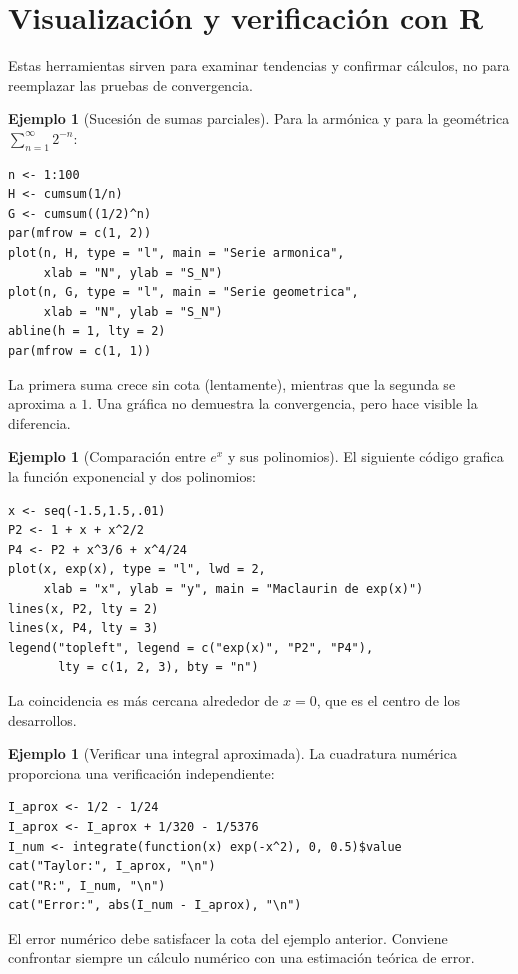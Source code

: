 \documentclass[12pt]{article}
\theoremstyle{definition}
\newtheorem{ejemplo}[teorema]{Ejemplo}
\theoremstyle{remark}
\begin{document}
\section{Visualización y verificación con R}
Estas herramientas sirven para examinar tendencias y confirmar cálculos, no para reemplazar las pruebas de convergencia.
\begin{ejemplo}[Sucesión de sumas parciales]
Para la armónica y para la geométrica $\sum_{n=1}^\infty2^{-n}$:
\par\medskip
\begin{verbatim}
n <- 1:100
H <- cumsum(1/n)
G <- cumsum((1/2)^n)
par(mfrow = c(1, 2))
plot(n, H, type = "l", main = "Serie armonica",
     xlab = "N", ylab = "S_N")
plot(n, G, type = "l", main = "Serie geometrica",
     xlab = "N", ylab = "S_N")
abline(h = 1, lty = 2)
par(mfrow = c(1, 1))
\end{verbatim}
La primera suma crece sin cota (lentamente), mientras que la segunda se aproxima a $1$. Una gráfica no demuestra la convergencia, pero hace visible la diferencia.
\end{ejemplo}
\begin{ejemplo}[Comparación entre $e^x$ y sus polinomios]
El siguiente código grafica la función exponencial y dos polinomios:

\par\medskip
\begin{verbatim}
x <- seq(-1.5,1.5,.01)
P2 <- 1 + x + x^2/2
P4 <- P2 + x^3/6 + x^4/24
plot(x, exp(x), type = "l", lwd = 2,
     xlab = "x", ylab = "y", main = "Maclaurin de exp(x)")
lines(x, P2, lty = 2)
lines(x, P4, lty = 3)
legend("topleft", legend = c("exp(x)", "P2", "P4"),
       lty = c(1, 2, 3), bty = "n")
\end{verbatim}
La coincidencia es más cercana alrededor de $x=0$, que es el centro de los desarrollos.
\end{ejemplo}
\begin{ejemplo}[Verificar una integral aproximada]
La cuadratura numérica proporciona una verificación independiente:

\par\medskip
\begin{verbatim}
I_aprox <- 1/2 - 1/24
I_aprox <- I_aprox + 1/320 - 1/5376
I_num <- integrate(function(x) exp(-x^2), 0, 0.5)$value
cat("Taylor:", I_aprox, "\n")
cat("R:", I_num, "\n")
cat("Error:", abs(I_num - I_aprox), "\n")
\end{verbatim}
El error numérico debe satisfacer la cota del ejemplo anterior. Conviene confrontar siempre un cálculo numérico con una estimación teórica de error.
\end{ejemplo}
\end{document}
